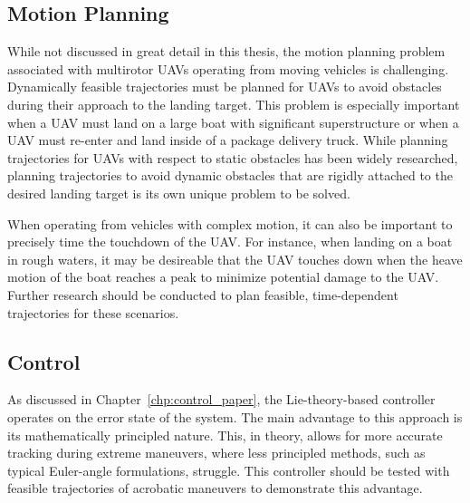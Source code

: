 \subsection{Motion Planning}
\label{sec:future_motion_planning}
While not discussed in great detail in this thesis, the motion planning problem
associated with multirotor UAVs operating from moving vehicles is 
challenging.
Dynamically feasible trajectories must be planned for UAVs to avoid
obstacles during their approach to the landing target.
This problem is especially important when a UAV must land on a large boat
with significant superstructure or when a UAV must re-enter and land inside of a
package delivery truck. While planning trajectories for UAVs with respect to
static obstacles has been widely researched, planning trajectories to avoid
dynamic obstacles that are rigidly attached to the desired landing target is its
own unique problem to be solved.

When operating from vehicles with complex motion, 
it can also be important to precisely time the touchdown of the UAV.
For instance, when landing on a boat in rough
waters, it may be desireable that the UAV touches down when the heave motion of the
boat reaches a peak to minimize potential damage to the UAV.
Further research should be conducted to plan feasible, time-dependent
trajectories for these scenarios.



\subsection{Control}
As discussed in Chapter~\ref{chp:control_paper}, the Lie-theory-based controller
operates on the error state of the system.
The main advantage to this approach is its mathematically principled nature.
This, in
theory, allows for more accurate tracking during extreme maneuvers, where
less principled methods, such as typical Euler-angle formulations, struggle.
This controller should be tested with feasible trajectories of acrobatic
maneuvers to demonstrate this advantage.

